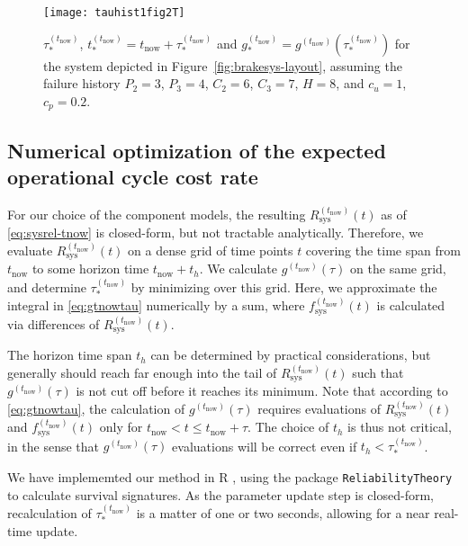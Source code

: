 \documentclass[authoryear]{elsarticle}
\def\tnow{t_\text{now}}
\newcommand{\Rsysnow}{R^{(t_\text{now})}_\text{sys}}
\newcommand{\fsysnow}{f^{(t_\text{now})}_\text{sys}}
\newcommand{\gnow}{g^{(\tnow)}}
\newcommand{\tausnow}{\tau_*^{(\tnow)}}
\newcommand{\tstarnow}{t_*^{(\tnow)}}
\newcommand{\gstarnow}{g_*^{(\tnow)}}
\newcommand{\gtotalnow}{g_\text{total}^{(\tnow)}}
\begin{document}
\begin{figure}
\texttt{[image: tauhist1fig2T]}
\caption[t]{$\tausnow$, $\tstarnow = \tnow + \tausnow$ and $\gstarnow = \gnow(\tausnow)$
for the system depicted in Figure~\ref{fig:brakesys-layout},
assuming the failure history $P_2 = 3$, $P_3 = 4$, $C_2 = 6$, $C_3 = 7$, $H = 8$,
and $c_u = 1$, $c_p = 0.2$.}
\label{fig:tauhist1fig2T}
\end{figure}


\subsection{Numerical optimization of the expected operational cycle cost rate}
\label{sec:optim}

For our choice of the component models,
the resulting $\Rsysnow(t)$ as of \eqref{eq:sysrel-tnow}
is closed-form, but not tractable analytically.
Therefore,
we evaluate $\Rsysnow(t)$ on a dense grid of time points $t$
covering the time span from $\tnow$ to some horizon time $\tnow + t_h$.
We calculate $\gnow(\tau)$ on the same grid,
and determine $\tausnow$ by minimizing over this grid.
Here, we approximate the integral in \eqref{eq:gtnowtau} numerically by a sum,
where $\fsysnow(t)$ is calculated via differences of $\Rsysnow(t)$.

The horizon time span $t_h$ can be determined by practical considerations,
but generally should reach far enough into the tail of $\Rsysnow(t)$
such that $\gnow(\tau)$ is not cut off before it reaches its minimum. %
Note that according to \eqref{eq:gtnowtau},
the calculation of $\gnow(\tau)$ requires
evaluations of $\Rsysnow(t)$ and $\fsysnow(t)$ only for $\tnow < t \le \tnow + \tau$.
The choice of $t_h$ is thus not critical,
in the sense that $\gnow(\tau)$ evaluations will be correct even if $t_h < \tausnow$.

We have implememted our method in \textsf{R} \citep{R},
using the package \texttt{ReliabilityTheory} \citep{2016:aslett-RT}
to calculate survival signatures.
As the parameter update step is closed-form,
recalculation of $\tausnow$ is a matter of one or two seconds,
allowing for a near real-time update.
%
\end{document}
